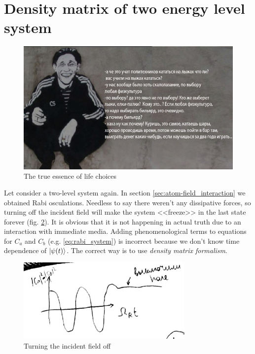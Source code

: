 \section{Density matrix of two energy level system}

\begin{figure}[h!]
	\centering
	\includegraphics[width=0.8\linewidth]{fig/L4/true_Baiko}
	\caption{The true essence of life choices}
	\label{fig:truebaiko}
\end{figure}

Let consider a two-level system again. In section \ref{sec:atom-field_interaction} we obtained Rabi osculations. Needless to say there weren't any dissipative forces, so turning off the incident field will make the system <<freeze>> in the last state forever (fig. \ref{fig:turnofffield}). It is obvious that it is not happening in actual truth due to an interaction with immediate media. Adding phenomenological terms to equations for $C_a$ and $C_b$ (e.g. \eqref{eq:rabi_system}) is incorrect because we don't know time dependence of $\lvert\psi(t)\rangle$. The correct way is to use \textit{density matrix formalism}.

\begin{figure}[h!]
	\centering
	\includegraphics[width=0.65\linewidth]{fig/L5/turn_off_field}
	\caption{Turning the incident field off}
	\label{fig:turnofffield}
\end{figure}


